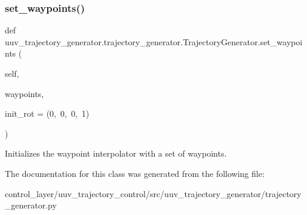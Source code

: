 \subsubsection{\texorpdfstring{set\+\_\+waypoints()}{set\_waypoints()}}
{\footnotesize\ttfamily def uuv\+\_\+trajectory\+\_\+generator.\+trajectory\+\_\+generator.\+Trajectory\+Generator.\+set\+\_\+waypoints (\begin{DoxyParamCaption}\item[{}]{self,  }\item[{}]{waypoints,  }\item[{}]{init\+\_\+rot = {\ttfamily (0,~0,~0,~1)} }\end{DoxyParamCaption})}

\begin{DoxyVerb}Initializes the waypoint interpolator with a set of waypoints.\end{DoxyVerb}
 

The documentation for this class was generated from the following file\+:\begin{DoxyCompactItemize}
\item 
control\+\_\+layer/uuv\+\_\+trajectory\+\_\+control/src/uuv\+\_\+trajectory\+\_\+generator/trajectory\+\_\+generator.\+py\end{DoxyCompactItemize}
